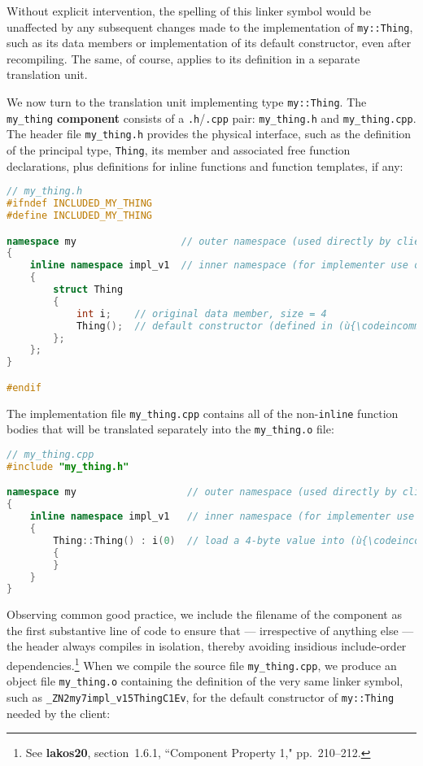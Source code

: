 \noindent Without explicit intervention, the spelling of this linker symbol would
be unaffected by any subsequent changes made to the implementation of
\texttt{my::Thing}, such as its data members or implementation of its
default constructor, even after recompiling. The same, of course,
applies to its definition in a separate translation unit.

We now turn to the translation unit implementing type
\texttt{my::Thing}. The \texttt{my\_thing} \textbf{component} consists
of a \texttt{.h}/\texttt{.cpp} pair: \texttt{my\_thing.h} and
\texttt{my\_thing.cpp}. The header file \texttt{my\_thing.h} provides
the physical interface, such as the definition of the principal type,
\texttt{Thing}, its member and associated free function declarations,
plus definitions for inline functions and function templates, if any:

\begin{lstlisting}[language=C++]
// my_thing.h
#ifndef INCLUDED_MY_THING
#define INCLUDED_MY_THING

namespace my                  // outer namespace (used directly by clients)
{
    inline namespace impl_v1  // inner namespace (for implementer use only)
    {
        struct Thing
        {
            int i;    // original data member, size = 4
            Thing();  // default constructor (defined in (ù{\codeincomments{my\_thing.cpp}}ù))
        };
    };
}

#endif
\end{lstlisting}

\noindent The implementation file \texttt{my\_thing.cpp} contains all of the
non-\texttt{inline} function bodies that will be translated separately
into the \texttt{my\_thing.o} file:

\begin{lstlisting}[language=C++]
// my_thing.cpp
#include "my_thing.h"

namespace my                   // outer namespace (used directly by clients)
{
    inline namespace impl_v1   // inner namespace (for implementer use only)
    {
        Thing::Thing() : i(0)  // load a 4-byte value into (ù{\codeincomments{Thing}}ù)'s data member
        {
        }
    }
}
\end{lstlisting}

\noindent Observing common good practice, we include the filename of the component
as the first substantive line of code to ensure that --- irrespective of
anything else --- the header always compiles in isolation, thereby
avoiding insidious include-order dependencies.{\cprotect\footnote{See
  \textbf{{lakos20}}, section~1.6.1, ``Component Property 1," pp.~210--212.}} When we compile the source file \texttt{my\_thing.cpp},
we produce an object file \texttt{my\_thing.o} containing the definition
of the very same linker symbol, such as
\texttt{\_ZN2my7impl\_v15ThingC1Ev}, for the default constructor of
\texttt{my::Thing} needed by the client:

